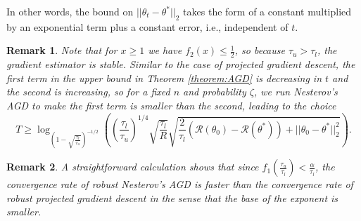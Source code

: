 \documentclass{article}
\newtheorem{remark}{\textbf{Remark}}
\begin{document}
In other words, the bound on $||\theta_t - \theta^*||_2$ takes the form of a constant multiplied by an exponential term plus a constant error, i.e., independent of $t$.

\begin{remark}
\label{remark:Nester_Iter_LB}
Note that for $x \geq 1$ we have $f_2(x) \leq \frac{1}{2}$, so because $\tau_u > \tau_l$, the gradient estimator is stable.
Similar to the case of projected gradient descent, the first term in the upper bound in Theorem \ref{theorem:AGD} is decreasing in $t$ and the second is increasing, so for a fixed $n$ and probability $\zeta$, we run Nesterov's AGD to make the first term is smaller than the second, leading to the choice
$$T \ge \log_{\left(1 - \sqrt{\frac{\tau_l}{\tau_u}}\right)^{-1/2}}\left(\left(\frac{\tau_l}{\tau_u}\right)^{1/4}\sqrt{\frac{\tau_l}{R}}\sqrt{\frac{2}{\tau_l}\left(\mathcal{R}(\theta_0) - \mathcal{R}(\theta^*)\right) + ||\theta_0 - \theta^*||_2^2}\right).
$$
\end{remark}

\begin{remark}
\label{RemFaster}
A straightforward calculation shows that since $f_1\left(\frac{\tau_u}{\tau_l}\right) < \frac{\alpha}{\tau_l}$, the convergence rate of robust Nesterov's AGD is faster than the convergence rate of robust projected gradient descent in the sense that the base of the exponent is smaller.
\end{remark}

\end{document}
